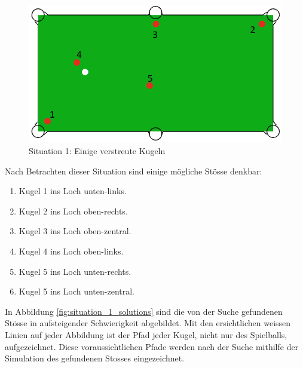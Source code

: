 %
%
\begin{figure}[h!]
    \begin{center}
        \includegraphics[width=0.4\linewidth]{../common/04_results/resources/simple_search/situation_diverse.PNG}
    \end{center}
    \caption{Situation 1: Einige verstreute Kugeln}
    \label{fig:search_situation_1}
\end{figure}

Nach Betrachten dieser Situation sind einige mögliche Stösse denkbar:
\begin{enumerate}
    \item Kugel 1 ins Loch unten-links.
    \item Kugel 2 ins Loch oben-rechts.
    \item Kugel 3 ins Loch oben-zentral.
    \item Kugel 4 ins Loch oben-links.
    \item Kugel 5 ins Loch unten-rechts.
    \item Kugel 5 ins Loch unten-zentral.
\end{enumerate}

In Abbildung \ref{fig:situation_1_solutions} sind die von der Suche gefundenen Stösse in aufsteigender Schwierigkeit abgebildet.
Mit den ersichtlichen weissen Linien auf jeder Abbildung ist der Pfad jeder Kugel, nicht nur des Spielballs, aufgezeichnet.
Diese voraussichtlichen Pfade werden nach der Suche mithilfe der Simulation des gefundenen Stosses eingezeichnet.

